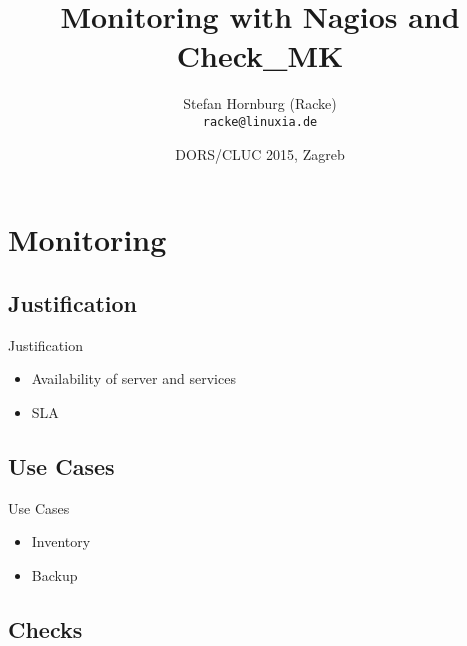 \usepackage[utf8]{inputenc}
\usepackage[T1]{fontenc}
\usepackage{mathptmx}
\usepackage[scaled=.90]{helvet}
\usepackage{courier}
\usepackage{caption}
\captionsetup{labelformat=empty,labelsep=none}
\usepackage{verbatim}
\usepackage{hyperref}
\usepackage{listings}
\usepackage{ulem}
\lstset{language=Perl,basicstyle=\normalsize,tabsize=3,showstringspaces=false}

\title{Monitoring with Nagios and Check\_MK}
\author[racke]{Stefan Hornburg (Racke)\\ \texttt{racke@linuxia.de}}
\date{DORS/CLUC 2015, Zagreb}


\maketitle{}

\begin{frame}
  \titlepage
\end{frame}

\tableofcontents

\section{Monitoring}

\subsection{Justification}

\begin{frame}[fragile]{Justification}
\begin{itemize}
\item Availability of server and services
\item SLA
\end{itemize}
\end{frame}

\subsection{Use Cases}
\begin{frame}[fragile]{Use Cases}
\begin{itemize}
\item Inventory
\item Backup
\end{itemize}
\end{frame}

\subsection{Checks}

